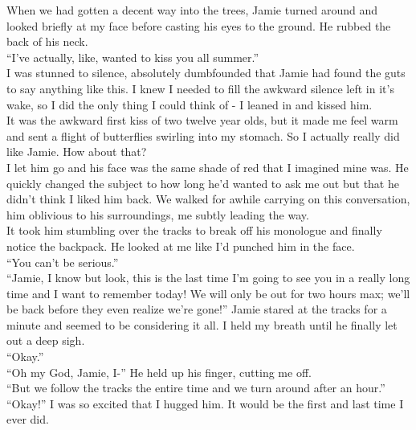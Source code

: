 \documentclass[a5paper]{scrartcl}
\begin{document}
When we had gotten a decent way into the trees, Jamie turned around and looked briefly at my face before casting his eyes to the ground. He rubbed the back of his neck.\\


\enquote{I've actually, like, wanted to kiss you all summer.}\\


I was stunned to silence, absolutely dumbfounded that Jamie had found the guts to say anything like this. I knew I needed to fill the awkward silence left in it's wake, so I did the only thing I could think of - I leaned in and kissed him. \\


It was the awkward first kiss of two twelve year olds, but it made me feel warm and sent a flight of butterflies swirling into my stomach. So I actually really did like Jamie. How about that?\\


I let him go and his face was the same shade of red that I imagined mine was. He quickly changed the subject to how long he'd wanted to ask me out but that he didn't think I liked him back. We walked for awhile carrying on this conversation, him oblivious to his surroundings, me subtly leading the way. \\


It took him stumbling over the tracks to break off his monologue and finally notice the backpack. He looked at me like I'd punched him in the face.\\


\enquote{You can't be serious.}\\

\enquote{Jamie, I know but look, this is the last time I'm going to see you in a really long time and I want to remember today! We will only be out for two hours max; we'll be back before they even realize we're gone!}
Jamie stared at the tracks for a minute and seemed to be considering it all. I held my breath until he finally let out a deep sigh.\\

\enquote{Okay.}\\


\enquote{Oh my God, Jamie, I-} He held up his finger, cutting me off.\\


\enquote{But we follow the tracks the entire time and we turn around after an hour.}\\


\enquote{Okay!} I was so excited that I hugged him. It would be the first and last time I ever did.\\
\end{document}

